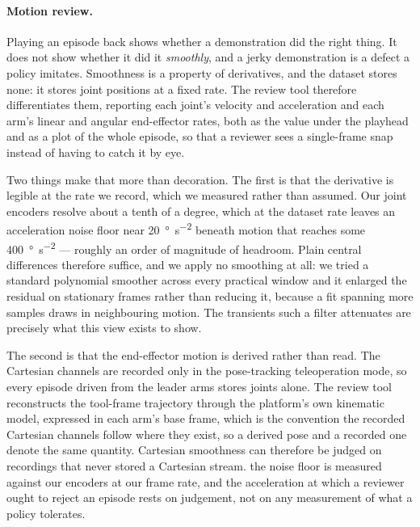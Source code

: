 \paragraph{Motion review.} Playing an episode back shows whether a
demonstration did the right thing. It does not show whether it did it
\emph{smoothly}, and a jerky demonstration is a defect a policy imitates.
Smoothness is a property of derivatives, and the dataset stores none: it stores
joint positions at a fixed rate. The review tool therefore differentiates them,
reporting each joint's velocity and acceleration and each arm's linear and
angular end-effector rates, both as the value under the playhead and as a plot
of the whole episode, so that a reviewer sees a single-frame snap instead of
having to catch it by eye.

Two things make that more than decoration. The first is that the derivative is
legible at the rate we record, which we measured rather than assumed. Our joint
encoders resolve about a tenth of a degree, which at the dataset rate leaves an
acceleration noise floor near \SI{20}{\degree\per\second\squared} beneath motion
that reaches some \SI{400}{\degree\per\second\squared} --- roughly an order of
magnitude of headroom. Plain central differences therefore suffice, and we apply
no smoothing at all: we tried a standard polynomial smoother across every
practical window and it enlarged the residual on stationary frames rather than
reducing it, because a fit spanning more samples draws in neighbouring motion.
The transients such a filter attenuates are precisely what this view exists to
show.

The second is that the end-effector motion is derived rather than read. The
Cartesian channels are recorded only in the pose-tracking teleoperation mode, so
every episode driven from the leader arms stores joints alone. The review tool
reconstructs the tool-frame trajectory through the platform's own kinematic
model, expressed in each arm's base frame, which is the convention the recorded
Cartesian channels follow where they exist, so a derived pose and a recorded one
denote the same quantity. Cartesian smoothness can therefore be judged on
recordings that never stored a Cartesian stream. \unjustified{} the noise floor
is measured against our encoders at our frame rate, and the acceleration at
which a reviewer ought to reject an episode rests on judgement, not on any
measurement of what a policy tolerates.
